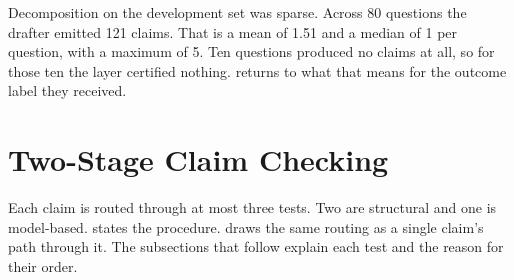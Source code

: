 Decomposition on the development set was sparse. Across 80 questions the drafter
emitted 121 claims. That is a mean of 1.51 and a median of 1 per question, with
a maximum of 5. Ten questions produced no claims at all, so for those ten the
layer certified nothing.  returns to what that
means for the outcome label they received.

\section{Two-Stage Claim Checking}\label{sec:two-stage}

Each claim is routed through at most three tests. Two are structural and one is
model-based.  states the procedure.  draws
the same routing as a single claim's path through it. The subsections that
follow explain each test and the reason for their order.

